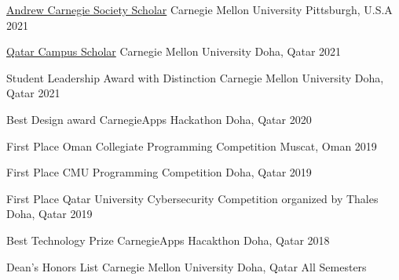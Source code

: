 



\begin{cvhonors}

\cvhonor
    {\href{https://www.cmu.edu/engage/give/donor-recognition/andrew-carnegie-society/acs-scholars.html}{Andrew Carnegie Society Scholar}} %
    {Carnegie Mellon University} %
    {Pittsburgh, U.S.A} %
    {2021} %

\cvhonor
    {\href{https://graduation.qatar.cmu.edu/awards-and-honors/}{Qatar Campus Scholar}} %
    {Carnegie Mellon University} %
    {Doha, Qatar} %
    {2021} %

\cvhonor
    {Student Leadership Award with Distinction} %
    {Carnegie Mellon University} %
    {Doha, Qatar} %
    {2021} %

\cvhonor
    {Best Design award} %
    {CarnegieApps Hackathon } %
    {Doha, Qatar} %
    {2020} %

\cvhonor
    {First Place} %
    {Oman Collegiate Programming Competition} %
    {Muscat, Oman} %
    {2019} %

\cvhonor
    {First Place} %
    {CMU Programming Competition} %
    {Doha, Qatar} %
    {2019} %

  \cvhonor
    {First Place} %
    {Qatar University Cybersecurity Competition organized by Thales } %
    {Doha, Qatar} %
    {2019} %

  \cvhonor
    {Best Technology Prize} %
    {CarnegieApps Hacakthon} %
    {Doha, Qatar} %
    {2018} %

  \cvhonor
    {Dean's Honors List} %
    {Carnegie Mellon University} %
    {Doha, Qatar} %
    {All Semesters} %

\end{cvhonors}


